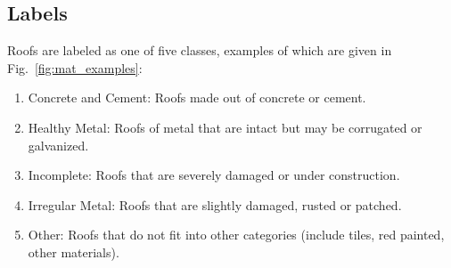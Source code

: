 \documentclass[11pt]{article}
\begin{document}
	\subsection{Labels}
	
	Roofs are labeled as one of five classes, examples of which are given in Fig.~\ref{fig:mat_examples}: 
	
	\begin{enumerate}
		\itemsep0em
		\item Concrete and Cement: Roofs made out of concrete or cement.
		\item Healthy Metal: Roofs of metal that are intact but may be corrugated or galvanized.
		\item Incomplete: Roofs that are severely damaged or under construction.
		\item Irregular Metal: Roofs that are slightly damaged, rusted or patched.
		\item Other: Roofs that do not fit into other categories (include tiles, red painted, other materials).
	\end{enumerate}
\end{document}
